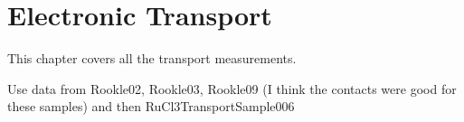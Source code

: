 \chapter{Electronic Transport}
This chapter covers all the transport measurements.

Use data from Rookle02, Rookle03, Rookle09 (I think the contacts were good for these samples) and then RuCl3TransportSample006